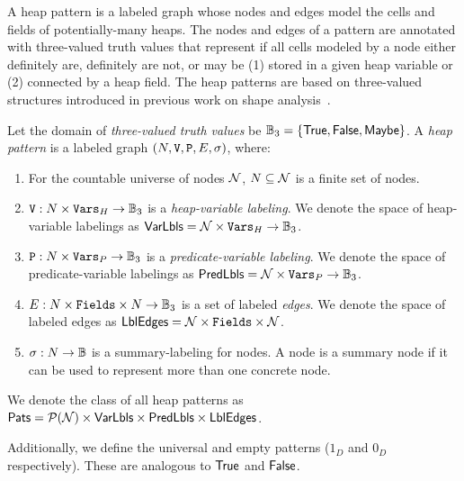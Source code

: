 A heap pattern is a labeled graph whose nodes and edges model the
cells and fields of potentially-many heaps.
%
The nodes and edges of a pattern are annotated with three-valued truth
values that represent if all cells modeled by a node either definitely
are, definitely are not, or may be (1) stored in a given heap variable
or (2) connected by a heap field.
%
The heap patterns are based on three-valued structures introduced in
previous work on shape analysis~\cite{sagiv02}.
%
\begin{defn}
  \label{defn:pattern}
  Let the domain of \emph{three-valued truth values} be $\mathbb{B}_3 =
  \{ \mathsf{True}, \mathsf{False}, \mathsf{Maybe} \}$.
  A \emph{heap pattern} is a labeled graph $(N, \mathtt{V},
  \mathtt{P}, E, \sigma)$, where:
  \begin{enumerate}
  \item
    For the countable universe of nodes $\mathcal{N}$, $N
    \subseteq \mathcal{N}$ is a finite set of nodes.
  \item
    $\mathtt{V}: N \times \mathtt{Vars}_H \to \mathbb{B}_3$ is a
    \emph{heap-variable labeling}.
    We denote the space of heap-variable labelings as $\mathsf{VarLbls} =
    \mathcal{N} \times \mathtt{Vars}_H \to \mathbb{B}_3$.
  \item
    $\mathtt{P}: N \times \mathtt{Vars}_P \to \mathbb{B}_3$ is a
    \emph{predicate-variable labeling}.
    We denote the space of predicate-variable labelings as $\mathsf{PredLbls} =
    \mathcal{N} \times \mathtt{Vars}_P \to \mathbb{B}_3$.
  \item
    $E: N \times \mathtt{Fields} \times N \to \mathbb{B}_3$ is a set of
    labeled \emph{edges}.
    We denote the space of labeled edges as $\mathsf{LblEdges} = \mathcal{N}
    \times \mathtt{Fields} \times \mathcal{N}$.
  \item
    $\sigma: N \to \mathbb{B}$ is a summary-labeling for nodes. A node is a summary node if it can be used to represent more than one concrete node.
  \end{enumerate}
  We denote the class of all heap patterns as $\mathsf{Pats} =
  \mathcal{P}(\mathcal{N}) \times \mathsf{VarLbls} \times \mathsf{PredLbls} \times \mathsf{LblEdges}$.
\end{defn}

Additionally, we define the universal and empty patterns ($1_D$ and $0_D$ respectively). These are analogous to $\mathsf{True}$ and $\mathsf{False}$.

